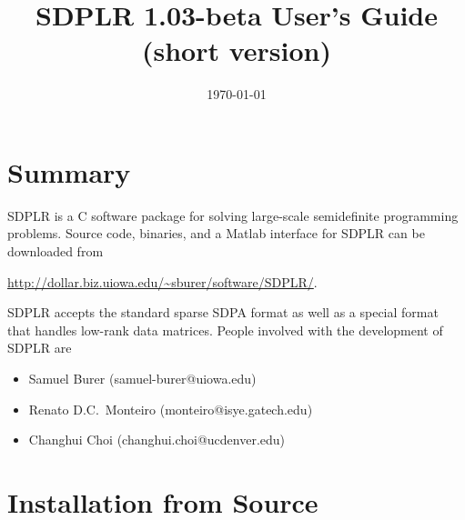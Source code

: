 \documentclass[12pt]{article}
\begin{document}
\title{SDPLR 1.03-beta User's Guide (short version)}

\date{\today}

\maketitle

\section{Summary}

SDPLR is a C software package for solving large-scale semidefinite
programming problems. Source code, binaries, and a Matlab
interface for SDPLR can be downloaded from
\begin{center}
\url{http://dollar.biz.uiowa.edu/~sburer/software/SDPLR/}.
\end{center}
SDPLR accepts the standard sparse SDPA format as well as a special
format that handles low-rank data matrices. People involved with
the development of SDPLR are
\begin{itemize}

\item Samuel Burer (samuel-burer@uiowa.edu)

\item Renato D.C.\ Monteiro (monteiro@isye.gatech.edu)

\item Changhui Choi (changhui.choi@ucdenver.edu)

\end{itemize}

\section{Installation from Source}
\end{document}
